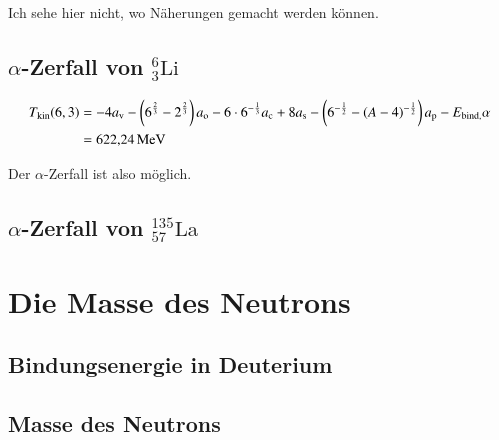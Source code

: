 Ich sehe hier nicht, wo Näherungen gemacht werden können.

\subsection{$\alpha$-Zerfall von $_3^6\text{Li}$}

\begin{align*}
    T_\text{kin}(6,3) &= -4a_\text{v}-\del{6^{\frac23}-2^{\frac23}}a_\text{o}
    -6\cdot6^{-\frac13}a_\text{c}+8a_\text{s}-\del{6^{-\half}-
    \del{A-4}^{-\half}}a_\text{p}-E_\text{bind,}\alpha \\
    &= \SI{622.24}{\mega\electronvolt}
\end{align*}

Der $\alpha$-Zerfall ist also möglich.

\subsection{$\alpha$-Zerfall von $_{57}^{135}\text{La}$}



\section{Die Masse des Neutrons}
\subsection{Bindungsenergie in Deuterium}
\subsection{Masse des Neutrons}



